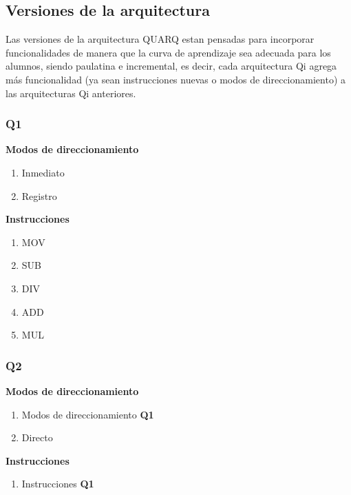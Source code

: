 \subsection{Versiones de la arquitectura}

Las versiones de la arquitectura QUARQ estan pensadas para incorporar funcionalidades de manera que la curva de aprendizaje sea adecuada para los alumnos, siendo paulatina e incremental, es decir, cada arquitectura Qi agrega más funcionalidad (ya sean instrucciones nuevas o modos de direccionamiento) a las arquitecturas Qi anteriores.

\subsubsection{Q1}

\textbf{Modos de direccionamiento}
\begin{enumerate}
\item Inmediato
\item Registro
\end{enumerate}

\textbf{Instrucciones}
\begin{enumerate}
\item MOV
\item SUB 
\item DIV 
\item ADD 
\item MUL
\end{enumerate}


\subsubsection{Q2}

\textbf{Modos de direccionamiento}
\begin{enumerate}
\item Modos de direccionamiento \textbf{Q1}
\item Directo 
\end{enumerate}

\textbf{Instrucciones}
\begin{enumerate}
\item Instrucciones \textbf{Q1}
\end{enumerate}

